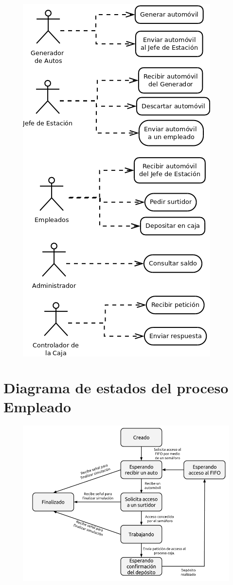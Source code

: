 \documentclass[12pt,a4paper,spanish]{article}
\begin{document}
	\begin{figure}[h]
	\includegraphics[scale=0.50]{casos_de_uso.png}
	\centering
	\end{figure}

	\newpage
	\section{Diagrama de estados del proceso Empleado}

	\begin{figure}[h]
	\includegraphics[scale=0.60]{FSM_Empleado.png}
	\centering
	\end{figure}
\end{document}
